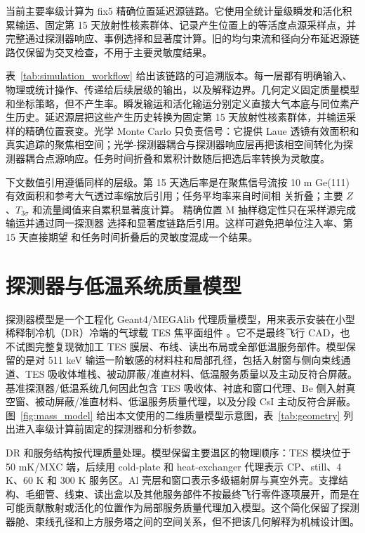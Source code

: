 \documentclass[preprint,12pt]{elsarticle}
\begin{document}
当前主要率级计算为 fix5 精确位置延迟源链路。它使用全统计量级瞬发和活化积累输运、固定第 15 天放射性核素群体、记录产生位置上的等活度点源采样点，并完整通过探测器响应、事例选择和显著度计算。旧的均匀束流和径向分布延迟源链路仅保留为交叉检查，不用于主要灵敏度结果。

表~\ref{tab:simulation_workflow} 给出该链路的可追溯版本。每一层都有明确输入、物理或统计操作、传递给后续层级的输出，以及解释边界。几何定义固定质量模型和坐标策略，但不产生率。瞬发输运和活化输运分别定义直接大气本底与同位素产生历史。延迟源层把这些产生历史转换为固定第 15 天放射性核素群体，并输运采样的精确位置衰变。光学 Monte Carlo 只负责信号：它提供 Laue 透镜有效面积和真实追踪的聚焦相空间；光学-探测器耦合与探测器响应层再把该相空间转化为探测器耦合点源响应。任务时间折叠和累积计数随后把选后率转换为灵敏度。

下文数值引用遵循同样的层级。第 15 天选后率是在聚焦信号流按 10 m
Ge(111) 有效面积和参考大气透过率缩放后引用；任务平均率来自时间相
关折叠；主要 $Z$、$T_{3\sigma}$ 和流量阈值来自累积显著度计算。
精确位置 M 抽样稳定性只在采样源完成输运并通过同一探测器
选择和显著度链路后引用。这样可避免把单位注入率、第 15 天直接期望
和任务时间折叠后的灵敏度混成一个结果。



\clearpage

\section{探测器与低温系统质量模型}
\label{sec:geometry}

探测器模型是一个工程化 Geant4/MEGAlib 代理质量模型，用来表示安装在小型稀释制冷机（DR）冷端的气球载 TES 焦平面组件 \cite{Shirazi2023,Gottardi2021TESReview}。它不是最终飞行 CAD，也不试图完整复现微加工 TES 膜层、布线、读出布局或全部低温服务部件。模型保留的是对 511 keV 输运一阶敏感的材料柱和局部孔径，包括入射窗与侧向束线通道、TES 吸收体堆栈、被动屏蔽/准直材料、低温服务质量以及主动反符合屏蔽。基准探测器/低温系统几何因此包含 TES 吸收体、衬底和窗口代理、Be 侧入射真空窗、被动屏蔽/准直材料、低温服务质量代理，以及分段 CsI 主动反符合屏蔽。图~\ref{fig:mass_model} 给出本文使用的二维质量模型示意图，表~\ref{tab:geometry} 列出进入率级计算前固定的探测器和分析参数。

DR 和服务结构按代理质量处理。模型保留主要温区的物理顺序：TES 模块位于 50 mK/MXC 端，后续用 cold-plate 和 heat-exchanger 代理表示 CP、still、4 K、60 K 和 300 K 服务区。Al 壳层和窗口表示多级辐射屏与真空外壳。支撑结构、毛细管、线束、读出盒以及其他服务部件不按最终飞行零件逐项展开，而是在可能贡献散射或活化的位置作为局部服务质量代理加入模型。这个简化保留了探测器舱、束线孔径和上方服务塔之间的空间关系，但不把该几何解释为机械设计图。
\end{document}
